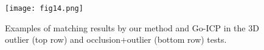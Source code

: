 \documentclass[11pt,bezier,]{article}
\begin{document}
\begin{figure}[!h]

\texttt{[image: fig14.png]}

% 







  \caption{
Examples of   matching results by our method and Go-ICP 
in the 3D outlier (top row) and occlusion+outlier (bottom row) tests.
  \label{3D_nonrotate_exa}}
\end{figure}
\end{document}
